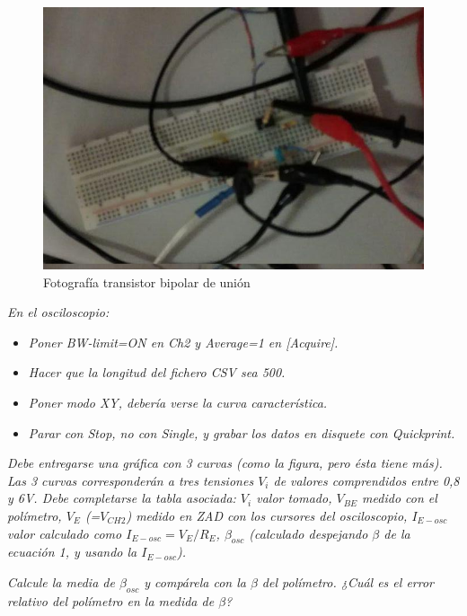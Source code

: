 \documentclass[paper=a4, fontsize=11pt]{scrartcl} %
\numberwithin{equation}{section} %
\numberwithin{figure}{section} %
\numberwithin{table}{section} %
\begin{document}
\begin{figure}[H]
	\centering
	\includegraphics[scale=0.7]{image/transistorA}
	\caption{Fotografía transistor bipolar de unión}
	\label{fig:foto-transistorA}
\end{figure}

\textit{En el osciloscopio:}

\begin{itemize}
	\item \textit{Poner BW-limit=ON en Ch2 y Average=1 en [Acquire].}
	\item \textit{Hacer que la longitud del fichero CSV sea 500.}
	\item \textit{Poner modo XY, debería verse la curva característica.}
	\item \textit{Parar con Stop, no con Single, y grabar los datos en disquete con Quickprint.}
\end{itemize}

\textit{Debe entregarse una gráfica con 3 curvas (como la figura, pero ésta tiene más). Las 3 curvas corresponderán a tres tensiones $ V_{i} $ de valores comprendidos entre 0,8 y 6V. Debe completarse la tabla asociada: $ V_{i} $ valor tomado, $ V_{BE} $ medido con el polímetro, $ V_{E} $ (=$ V_{CH2} $) medido en ZAD con los cursores del osciloscopio, $ I_{E-osc} $ valor calculado como $ I_{E-osc}=V_{E}/R_{E} $, $ \beta_{osc} $ (calculado despejando $ \beta $ de la ecuación 1, y usando la $ I_{E-osc} $).} 

\textit{Calcule la media de $ \beta_{osc} $ y compárela con la $ \beta $ del polímetro. ¿Cuál es el error relativo del polímetro en la medida de $ \beta $?} \newline
\end{document}
